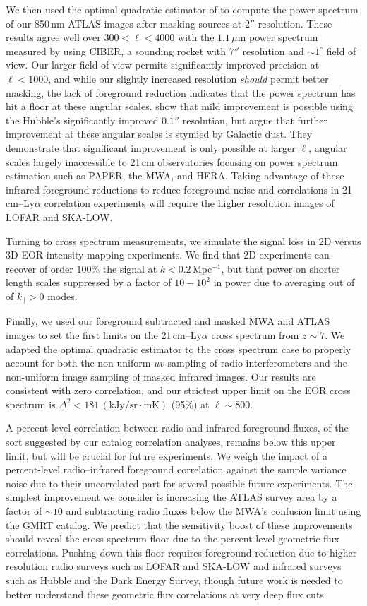 \documentclass[numberedappendix]{emulateapj}
\begin{document}
We then used the optimal quadratic estimator of \citet{Maxpowerspeclossless} to compute the power spectrum of our 850\,nm ATLAS images after masking sources at $2''$ resolution. These results agree well over $300<\ell<4000$ with the $1.1$\,$\mu$m power spectrum measured by \citep{zemcov14} using CIBER, a sounding rocket with $7''$ resolution and $\sim1^\circ$ field of view. Our larger field of view permits significantly improved precision at $\ell<1000$, and while our slightly increased resolution \textit{should} permit better masking, the lack of foreground reduction indicates that the power spectrum has hit a floor at these angular scales. \citet{mw15} show that mild improvement is possible using the Hubble's significantly improved $0.1''$ resolution, but argue that further improvement at these angular scales is stymied by Galactic dust. They demonstrate that significant improvement is only possible at larger $\ell$, angular scales largely inaccessible to 21\,cm observatories focusing on power spectrum estimation such as PAPER, the MWA, and HERA. Taking advantage of these infrared foreground reductions to reduce foreground noise and correlations in 21\,cm--Ly$\alpha$ correlation experiments will require the higher resolution images of  LOFAR and SKA-LOW.

Turning to cross spectrum measurements, we simulate the signal loss in 2D versus 3D EOR intensity mapping experiments. We find that 2D experiments can recover of order 100\% the signal at $k<0.2$\,Mpc$^{-1}$, but that power on shorter length scales  suppressed by a factor of $10-10^2$ in power due to averaging out of of $k_\parallel>0$ modes. 

Finally, we used our foreground subtracted and masked MWA and ATLAS images to set the first limits on the 21\,cm--Ly$\alpha$ cross spectrum from $z\sim7$. We adapted the optimal quadratic estimator to the cross spectrum case to properly account for both the non-uniform $uv$ sampling of radio interferometers and the non-uniform image  sampling of masked infrared images. Our results are consistent with zero correlation, and our strictest upper limit on the EOR cross spectrum is $\Delta^2<181$\,$(\text{kJy/sr}\cdot \text{mK})$ (95\%) at $\ell\sim800$.

A percent-level correlation between radio and infrared foreground fluxes, of the sort suggested by our catalog correlation analyses, remains below this upper limit, but will be crucial for future experiments. We weigh the impact of a percent-level radio--infrared foreground correlation against the sample variance noise due to their uncorrelated part for several possible future experiments. The simplest improvement we consider is increasing the ATLAS survey area by a factor of $\sim10$ and subtracting radio fluxes below the MWA's confusion limit using the GMRT catalog. We predict that the sensitivity boost of these improvements should reveal the cross spectrum floor due to the percent-level geometric flux correlations. Pushing down this floor requires foreground reduction due to higher resolution radio surveys such as LOFAR and SKA-LOW and infrared surveys such as Hubble and the Dark Energy Survey, though future work is needed to better understand these geometric flux correlations at very deep flux cuts.
\end{document}
